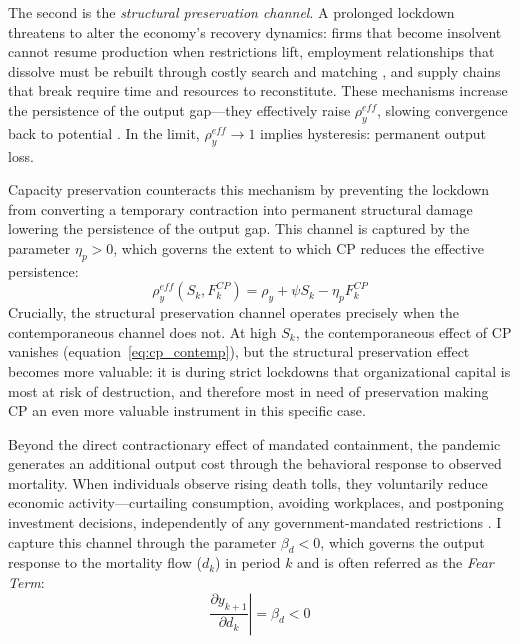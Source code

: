 \documentclass[12pt, a4paper]{article}
\begin{document}
The second is the \textit{structural preservation channel}. A prolonged lockdown threatens to alter the economy's recovery dynamics: firms that become insolvent cannot resume production when restrictions lift, employment relationships that dissolve must be rebuilt through costly search and matching \citep{Fujita2024}, and supply chains that break require time and resources to reconstitute. These mechanisms increase the persistence of the output gap---they effectively raise $\rho^{eff}_y$, slowing convergence back to potential \citep{Kozlowski2020, Cerra2020}. In the limit, $\rho^{eff}_y \to 1$ implies hysteresis: permanent output loss.

Capacity preservation counteracts this mechanism by preventing the lockdown from converting a temporary contraction into permanent structural damage lowering the persistence of the output gap. This channel is captured by the parameter $\eta_p > 0$, which governs the extent to which CP reduces the effective persistence:
%
\begin{equation}
    \rho^{eff}_y(S_k, F^{CP}_k) = \rho_y + \psi S_k - \eta_p F^{CP}_k
    \label{eq:rho_eff}
\end{equation}
%
Crucially, the structural preservation channel operates precisely when the contemporaneous channel does not. At high $S_k$, the contemporaneous effect of CP vanishes (equation~\ref{eq:cp_contemp}), but the structural preservation effect becomes more valuable: it is during strict lockdowns that organizational capital is most at risk of destruction, and therefore most in need of preservation making CP an even more valuable instrument in this specific case.


Beyond the direct contractionary effect of mandated containment, the pandemic generates an additional output cost through the behavioral response to observed mortality. When individuals observe rising death tolls, they voluntarily reduce economic activity---curtailing consumption, avoiding workplaces, and postponing investment decisions, independently of any government-mandated restrictions \citep{GOOLSBEE2021}. I capture this channel through the parameter $\beta_d < 0$, which governs the output response to the mortality flow ($d_k$) in period $k$ and is often referred as the \textit{Fear Term}:
%
\begin{equation}
    \left.\frac{\partial y_{k+1}}{\partial d_k}\right| = \beta_d < 0
    \label{eq:fear}
\end{equation}
%
\end{document}
